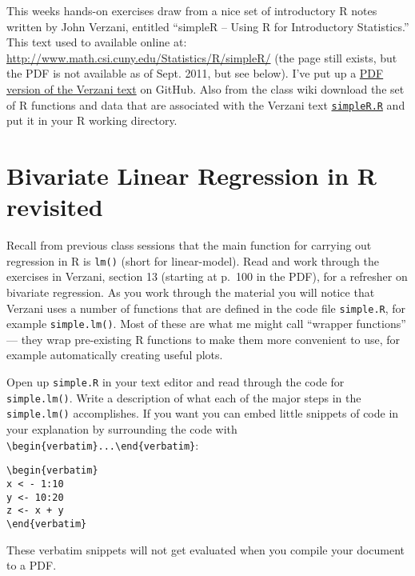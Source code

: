


This weeks hands-on exercises draw from a nice set of introductory R
notes written by John Verzani, entitled ``simpleR -- Using R for
Introductory Statistics.'' This text used to available online at:
\url{http://www.math.csi.cuny.edu/Statistics/R/simpleR/} (the page still
exists, but the PDF is not available as of Sept. 2011, but see below). I've put up a
\href{https://raw.github.com/pmagwene/Bio313/master/lecture-04/simpleR.pdf}{PDF version of the Verzani text} on GitHub. Also from the class wiki
download the set of R functions and data that are associated with the
Verzani text
\href{https://raw.github.com/pmagwene/Bio313/master/lecture-04/simpleR.R}{\lstinline!simpleR.R!}
and put it in your R working directory.

\section{Bivariate Linear Regression in R revisited}

Recall from previous class sessions that the main function for carrying
out regression in R is \lstinline!lm()! (short for linear-model). Read and work through the exercises in Verzani, section 13 (starting at
p.~100 in the PDF), for a refresher on bivariate regression. As you work
through the material you will notice that Verzani uses a number of
functions that are defined in the code file \lstinline!simple.R!, for
example \lstinline!simple.lm()!. Most of these are what me might call
``wrapper functions'' --- they wrap pre-existing R functions to make
them more convenient to use, for example automatically creating useful
plots.

\begin{assignment}
Open up \lstinline!simple.R! in your text editor
and read through the code for \lstinline!simple.lm()!. Write a
description of what each of the major steps in the
\lstinline!simple.lm()! accomplishes. If you want you can embed little
snippets of code in your explanation by surrounding the code with
\lstinline!\begin{verbatim}...\end{verbatim}!:

\smallskip
\begin{lstlisting}
\begin{verbatim}
x < - 1:10
y <- 10:20
z <- x + y
\end{verbatim}
\end{lstlisting}

\smallskip   
These verbatim snippets will not get evaluated when you compile your
document to a PDF.

\end{assignment}

